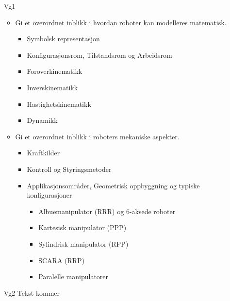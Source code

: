 		\begin{itemize}

			\item[Vg1] \begin{itemize}

							\item Gi et overordnet inblikk i hvordan roboter kan modelleres matematisk.

								\begin{itemize}
									\item Symbolsk representasjon
									\item Konfigurasjonsrom, Tilstandsrom og Arbeidsrom
									\item Foroverkinematikk
									\item Inverskinematikk
									\item Hastighetskinematikk
									\item Dynamikk
								\end{itemize}

							\item Gi et overordnet inblikk i roboters mekaniske aspekter.

								\begin{itemize}
									\item Kraftkilder
									\item Kontroll og Styringsmetoder
									\item Applikasjonsområder, Geometrisk oppbyggning og typiske konfigurasjoner

										\begin{itemize}
											\item Albuemanipulator (RRR) og 6-aksede roboter
											\item Kartesisk manipulator (PPP)
											\item Sylindrisk manipulator (RPP)
											\item SCARA (RRP)
											\item Paralelle manipulatorer
										\end{itemize}

								\end{itemize}

						\end{itemize}

			\item[Vg2] Tekst kommer

		\end{itemize}



